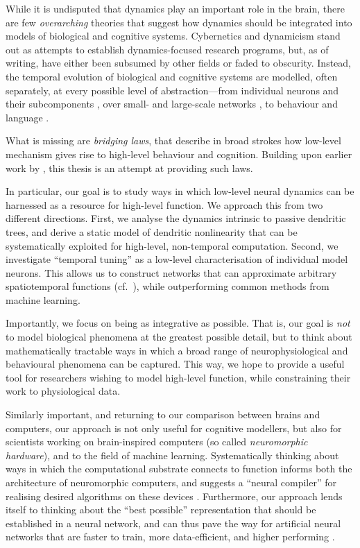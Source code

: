 While it is undisputed that dynamics play an important role in the brain, there are few \emph{overarching} theories that suggest how dynamics should be integrated into models of biological and cognitive systems.
Cybernetics \citep{wiener1948cybernetics} and dynamicism \citep{vangelder1998dynamical,eliasmith1996third} stand out as attempts to establish dynamics-focused research programs, but, as of writing, have either been subsumed by other fields or faded to obscurity.
Instead, the temporal evolution of biological and cognitive systems are modelled, often separately, at every possible level of abstraction---from individual neurons and their subcomponents \citep[e.g.,][]{gerstner2002spiking,izhikevich2007dynamical}, over small- and large-scale networks \citep[e.g.,][]{gerstner2014neuronal,bassett2017network}, to behaviour and language \citep[e.g.,][]{anderson1997actr,debot2007dynamic}.

What is missing are \emph{bridging laws}, that describe in broad strokes how low-level mechanism gives rise to high-level behaviour and cognition.
Building upon earlier work by \citet{eliasmith2003neural}, this thesis is an attempt at providing such laws.

In particular, our goal is to study ways in which low-level neural dynamics can be harnessed as a resource for high-level function.
We approach this from two different directions.
First, we analyse the dynamics intrinsic to passive dendritic trees, and derive a static model of dendritic nonlinearity that can be systematically exploited for high-level, non-temporal computation.
Second, we investigate \enquote{temporal tuning} as a low-level characterisation of individual model neurons.
This allows us to construct networks that can approximate arbitrary spatiotemporal functions (cf.~), while outperforming common methods from machine learning.

Importantly, we focus on being as integrative as possible.
That is, our goal is \emph{not} to model biological phenomena at the greatest possible detail, but to think about mathematically tractable ways in which a broad range of neurophysiological and behavioural phenomena can be captured.
This way, we hope to provide a useful tool for researchers wishing to model high-level function, while constraining their work to physiological data.

Similarly important, and returning to our comparison between brains and computers, our approach is not only useful for cognitive modellers, but also for scientists working on brain-inspired computers (so called \emph{neuromorphic hardware}), and to the field of machine learning.
Systematically thinking about ways in which the computational substrate connects to function informs both the architecture of neuromorphic computers, and suggests a \enquote{neural compiler} for realising desired algorithms on these devices \citep{boahen2017neuromorph,voelker2021programming}.
Furthermore, our approach lends itself to thinking about the \enquote{best possible} representation that should be established in a neural network, and can thus pave the way for artificial neural networks that are faster to train, more data-efficient, and higher performing \citep{voelker2019lmu,chilkuri2021parallelizing}.

